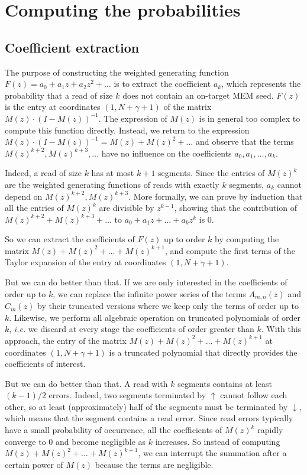 \documentclass{article}
\begin{document}
\section{Computing the probabilities}

\subsection{Coefficient extraction}

The purpose of constructing the weighted generating function $F(z) = a_0 +
a_1z + a_2z^2 + \ldots$ is to extract the coefficient $a_k$, which
represents the probability that a read of size $k$ does not contain an
on-target MEM seed. $F(z)$ is the entry at coordinates $(1,N+\gamma+1)$ of
the matrix $M(z) \cdot (I-M(z))^{-1}$. The expression of $M(z)$ is in
general too complex to compute this function directly. Instead, we return
to the expression $M(z) \cdot (I-M(z))^{-1} = M(z) + M(z)^2 + \ldots$ and
observe that the terms $M(z)^{k+2}, M(z)^{k+3}, \ldots$ have no influence
on the coefficients $a_0, a_1, \ldots, a_k$.

Indeed, a read of size $k$ has at most $k+1$ segments. Since the entries
of $M(z)^k$ are the weighted generating functions of reads with exactly
$k$ segments, $a_k$ cannot depend on $M(z)^{k+2}, M(z)^{k+3}$. More
formally, we can prove by induction that all the entries of $M(z)^k$ are
divisible by $z^{k-1}$, showing that the contribution of $M(z)^{k+2} +
M(z)^{k+3} + \ldots$ to $a_0 + a_1z + \ldots +a_kz^k$ is $0$.

So we can extract the coefficients of $F(z)$ up to order $k$ by computing
the matrix $M(z) + M(z)^2 + \ldots + M(z)^{k+1}$, and compute the first
terms of the Taylor expansion of the entry at coordinates
$(1,N+\gamma+1)$.

But we can do better than that. If we are only interested in the
coefficients of order up to $k$, we can replace the infinite power series
of the terms $A_{m,n}(z)$ and $C_m(z)$ by their truncated versions where
we keep only the terms of order up to $k$. Likewise, we perform all
algebraic operation on truncated polynomials of order $k$, \textit{i.e.}
we discard at every stage the coefficients of order greater than $k$. With
this approach, the entry of the matrix $M(z) + M(z)^2 + \ldots +
M(z)^{k+1}$ at coordinates $(1,N+\gamma+1)$ is a truncated polynomial that
directly provides the coefficients of interest.

But we can do better than that. A read with $k$ segments contains at least
$(k-1)/2$ errors. Indeed, two segments terminated by $\uparrow$ cannot
follow each other, so at least (approximately) half of the segments must
be terminated by $\downarrow$, which means that the segment contains a
read error. Since read errors typically have a small probability of
occurrence, all the coefficients of $M(z)^k$ rapidly converge to $0$ and
become negligible as $k$ increases. So instead of computing $M(z) + M(z)^2
+ \ldots + M(z)^{k+1}$, we can interrupt the summation after a certain
power of $M(z)$ because the terms are negligible.
\end{document}
